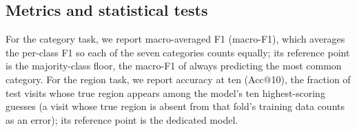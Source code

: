 %
\subsection{Metrics and statistical tests}
\label{sec:mobiwac:setup-metrics}
For the category task, we report macro-averaged F1 (macro-F1), which averages the per-class F1 so each of the seven categories counts equally; its reference point is the majority-class floor, the macro-F1 of always predicting the most common category. For the region task, we report accuracy at ten
(Acc@10), the fraction of test visits whose true region appears among the model's ten highest-scoring guesses
(a visit whose true region is absent from that fold's training data counts as an error); its
reference point is the dedicated model.

